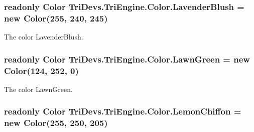 \hypertarget{struct_tri_devs_1_1_tri_engine_1_1_color_acb7e8823330b555d6fe14fff0487d960}{
\subsubsection[{Lavender\-Blush}]{\setlength{\rightskip}{0pt plus 5cm}readonly {\bf Color} Tri\-Devs.\-Tri\-Engine.\-Color.\-Lavender\-Blush = new {\bf Color}(255, 240, 245)\hspace{0.3cm}{\ttfamily [static]}}}\label{struct_tri_devs_1_1_tri_engine_1_1_color_acb7e8823330b555d6fe14fff0487d960}


The color Lavender\-Blush. 

\hypertarget{struct_tri_devs_1_1_tri_engine_1_1_color_ab034b011554dceb711e464506be9f0d2}{
\subsubsection[{Lawn\-Green}]{\setlength{\rightskip}{0pt plus 5cm}readonly {\bf Color} Tri\-Devs.\-Tri\-Engine.\-Color.\-Lawn\-Green = new {\bf Color}(124, 252, 0)\hspace{0.3cm}{\ttfamily [static]}}}\label{struct_tri_devs_1_1_tri_engine_1_1_color_ab034b011554dceb711e464506be9f0d2}


The color Lawn\-Green. 

\hypertarget{struct_tri_devs_1_1_tri_engine_1_1_color_a01dbe75f5995709f69132aa49b792426}{
\subsubsection[{Lemon\-Chiffon}]{\setlength{\rightskip}{0pt plus 5cm}readonly {\bf Color} Tri\-Devs.\-Tri\-Engine.\-Color.\-Lemon\-Chiffon = new {\bf Color}(255, 250, 205)\hspace{0.3cm}{\ttfamily [static]}}}\label{struct_tri_devs_1_1_tri_engine_1_1_color_a01dbe75f5995709f69132aa49b792426}


